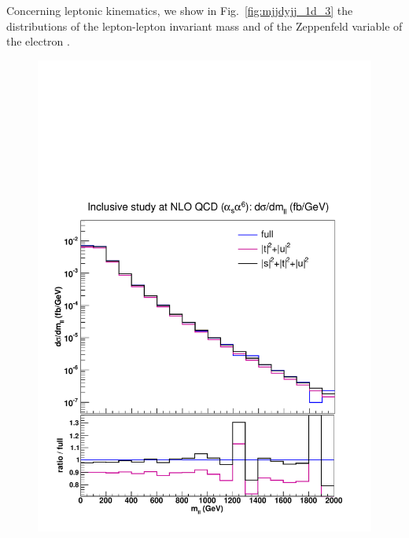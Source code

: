 Concerning leptonic kinematics, we show in Fig.~\ref{fig:mjjdyjj_1d_3} the distributions of the lepton-lepton invariant mass and of the Zeppenfeld variable of the electron .
\begin{figure}[hbt]
\centering
{\includegraphics[scale=0.35]{figures/scanfigures/mll_nlo.pdf}}

\end{figure}
